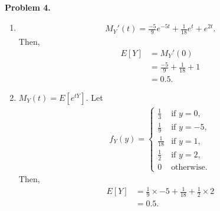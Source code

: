 \documentclass{article}
\begin{document}
\textbf{Problem 4.}
\begin{enumerate}[label={(\alph*)}]
    \item 
    \begin{align}
        M_Y'(t)=\frac{-5}{9}e^{-5t}+\frac{1}{18}e^t+e^{2t}.
    \end{align}
    Then,
    \begin{align}
        E[Y]&=M_Y'(0) \\
        &=\frac{-5}{9}+\frac{1}{18}+1\\
        &=0.5.
    \end{align}
    
    \item 
    $M_Y(t)=E[e^{tY}]$. Let 
    \begin{align}
        f_Y(y)=\begin{cases}
            \frac{1}{3} &\text{if }y=0, \\
            \frac{1}{9} &\text{if }y=-5, \\
            \frac{1}{18} &\text{if }y=1, \\
            \frac{1}{2} &\text{if }y=2, \\
            0 &\text{otherwise}.
        \end{cases}
    \end{align}
    Then,
    \begin{align}
        E[Y]&=\frac{1}{9}\times -5+\frac{1}{18}+\frac{1}{2}\times2 \\
        &= 0.5.
    \end{align}
\end{enumerate}
\bigbreak
\end{document}
